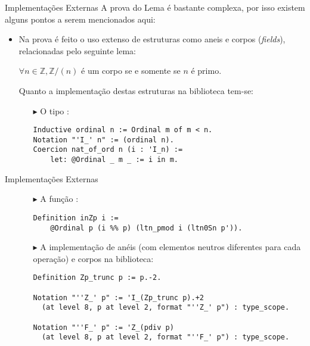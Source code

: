 \begin{frame}[fragile]{Implementações Externas}
    A prova do Lema  é bastante complexa, por isso existem alguns pontos a serem mencionados aqui:
    \begin{itemize}
        \item Na prova é feito o uso extenso de estruturas como aneis e corpos (\textit{fields}), relacionadas pelo seguinte lema:
            \begin{lema} \label{lema : anel:corpo}
                $\forall n \in \mathbb{Z}, \mathbb{Z}/(n)$ é um corpo se e somente se $n$ é primo. 
            \end{lema}
        Quanto a implementação destas estruturas na biblioteca tem-se:
            \begin{itemize}
                \item[$\blacktriangleright$] O tipo :
                
                    \begin{lstlisting}[language=coq,frame=single,tabsize=1]
Inductive ordinal n := Ordinal m of m < n.
Notation "'I_' n" := (ordinal n).
Coercion nat_of_ord n (i : 'I_n) := 
    let: @Ordinal _ m _ := i in m.
                    \end{lstlisting}
            \end{itemize}
    \end{itemize}
\end{frame}

\begin{frame}[fragile]{Implementações Externas}
    \begin{itemize}
        \item[] 
            \begin{itemize}
                \item[$\blacktriangleright$] A função :
                    \begin{lstlisting}[language=coq,frame=single,tabsize=1]
Definition inZp i := 
    @Ordinal p (i %% p) (ltn_pmod i (ltn0Sn p')).
                    \end{lstlisting}
                \item[$\blacktriangleright$] A implementação de anéis (com elementos neutros diferentes para cada operação) e corpos na biblioteca:
                    \begin{lstlisting}[language=coq,frame=single,tabsize=1]
Definition Zp_trunc p := p.-2.

Notation "''Z_' p" := 'I_(Zp_trunc p).+2
  (at level 8, p at level 2, format "''Z_' p") : type_scope.

Notation "''F_' p" := 'Z_(pdiv p)
  (at level 8, p at level 2, format "''F_' p") : type_scope.
                    \end{lstlisting}
            \end{itemize}
    \end{itemize}
\end{frame}

